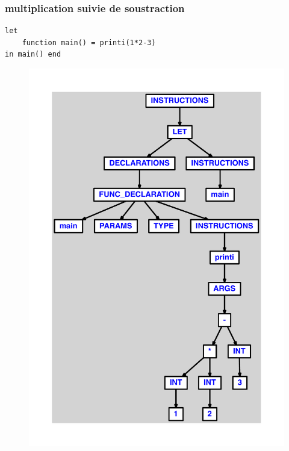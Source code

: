 \documentclass{article}
\begin{document}
\subsubsection{multiplication suivie de soustraction}
\begin{lstlisting}
let
	function main() = printi(1*2-3)
in main() end
\end{lstlisting}
\newpage
\begin{figure}[H]
\centering
\includegraphics[max width=\textwidth]{ast/ast_48.pdf}
\end{figure}
\newpage
\end{document}
